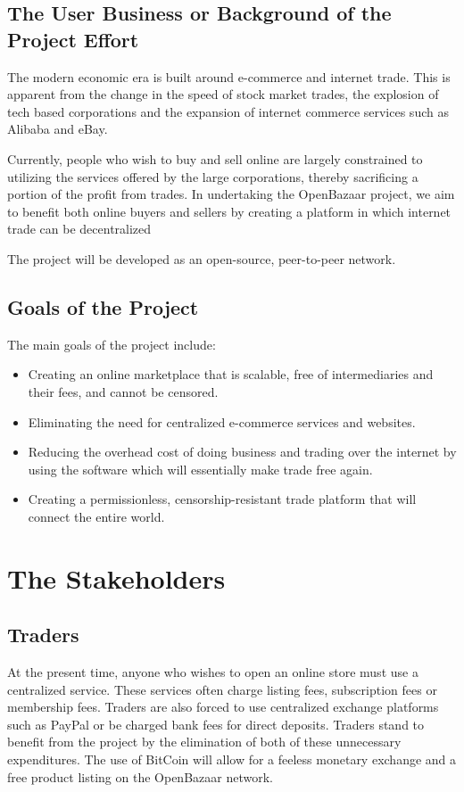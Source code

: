 \documentclass{article}
\begin{document}
\subsection{The User Business or Background of the Project Effort}

The modern economic era is built around e-commerce and internet trade. This is apparent from the change in the speed of stock market trades, the explosion of tech based corporations and the expansion of internet commerce services such as Alibaba and eBay.

Currently, people who wish to buy and sell online are largely constrained to utilizing the services offered by the large corporations, thereby sacrificing a portion of the profit from trades. In undertaking the OpenBazaar project, we aim to benefit both online buyers and sellers by creating a platform in which internet trade can be decentralized


The project will be developed as an open-source, peer-to-peer network. 


\subsection{Goals of the Project}
The main goals of the project include:

\begin{itemize}

\item
Creating an online marketplace that is scalable, free of intermediaries and their fees, and cannot be censored.

\item
Eliminating the need for centralized e-commerce services and websites.

\item
Reducing the overhead cost of doing business and trading over the internet by using the software which will essentially make trade free again.

\item
Creating a permissionless, censorship-resistant trade platform that will connect the entire world.
\end{itemize}

\section{The Stakeholders}

\subsection{Traders}
At the present time, anyone who wishes to open an online store must use a centralized service. These services often charge listing fees, subscription fees or membership fees. Traders are also forced to use centralized exchange platforms such as PayPal or be charged bank fees for direct deposits. Traders stand to benefit from the project by the elimination of both of these unnecessary expenditures. The use of BitCoin will allow for a feeless monetary exchange and a free product listing on the OpenBazaar network.
\end{document}
